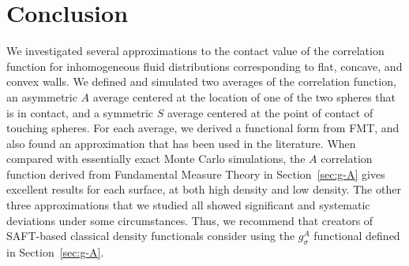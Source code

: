 \documentclass[letterpaper,twocolumn,amsmath,amssymb,jcp,10pt,aip]{revtex4-1}
\begin{document}
\section{Conclusion}
We investigated several approximations to the contact value of the
correlation function for inhomogeneous fluid distributions
corresponding to flat, concave, and convex walls.  We
defined and simulated two averages of the correlation function, an
asymmetric $A$ average centered at the location of one of the two
spheres that is in contact, and a symmetric $S$ average centered at
the point of contact of touching spheres.  For each average, we
derived a functional form from FMT, and also found an approximation
that has been used in the literature.  When compared with essentially
exact Monte Carlo simulations, the $A$ correlation function derived
from Fundamental Measure Theory in Section~\ref{sec:g-A} gives
excellent results for each surface, at both high density and low
density.  The other three approximations that we studied all showed
significant and systematic deviations under some circumstances.  Thus,
we recommend that creators of SAFT-based classical density functionals
consider using the $g_\sigma^A$ functional defined in
Section~\ref{sec:g-A}.


\appendix


\end{document}
